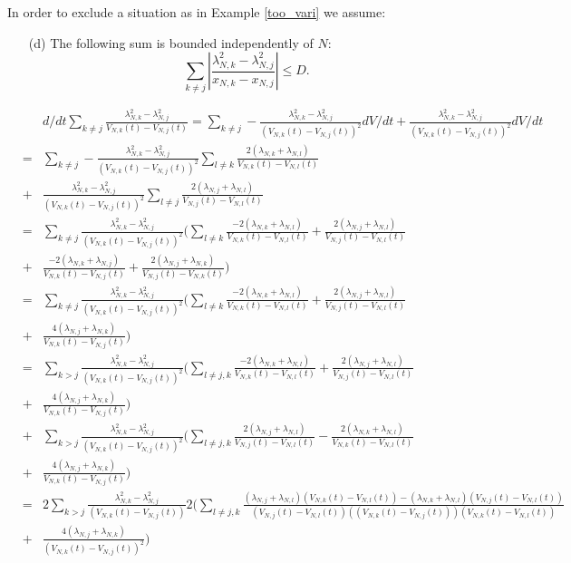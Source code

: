 \documentclass[a4paper,twoside,11pt]{article}
\theoremstyle{plain}
\theoremstyle{definition}
\theoremstyle{remark}
\begin{document}
In order to exclude a situation as in Example \ref{too_vari} we assume:
\begin{itemize}
\item[(d)] The following sum is bounded independently of $N$:
$$ \sum_{k\not=j} \left|\frac{\lambda_{N,k}^2-\lambda_{N,j}^2}{x_{N,k}-x_{N,j}}\right| \leq D. $$
\end{itemize}

{\color{orange} \begin{eqnarray*}
&& d/dt \sum_{k\not=j}\frac{\lambda_{N,k}^2-\lambda_{N,j}^2}{V_{N,k}(t)-V_{N,j}(t)} = \sum_{k\not=j}-\frac{\lambda_{N,k}^2-\lambda_{N,j}^2}{(V_{N,k}(t)-V_{N,j}(t))^2} dV/dt + \frac{\lambda_{N,k}^2-\lambda_{N,j}^2}{(V_{N,k}(t)-V_{N,j}(t))^2} dV/dt \\
&=&  \sum_{k\not=j}-\frac{\lambda_{N,k}^2-\lambda_{N,j}^2}{(V_{N,k}(t)-V_{N,j}(t))^2} \sum_{l\not=k}\frac{2(\lambda_{N,k}+\lambda_{N,l})}{V_{N,k}(t)-V_{N,l}(t)} \\
&+&  \frac{\lambda_{N,k}^2-\lambda_{N,j}^2}{(V_{N,k}(t)-V_{N,j}(t))^2} \sum_{l\not=j}\frac{2(\lambda_{N,j}+\lambda_{N,l})}{V_{N,j}(t)-V_{N,l}(t)} \\
&=& \sum_{k\not=j}\frac{\lambda_{N,k}^2-\lambda_{N,j}^2}{(V_{N,k}(t)-V_{N,j}(t))^2} (\sum_{l\not=k}\frac{-2(\lambda_{N,k}+\lambda_{N,l})}{V_{N,k}(t)-V_{N,l}(t)} +  \frac{2(\lambda_{N,j}+\lambda_{N,l})}{V_{N,j}(t)-V_{N,l}(t)}\\
&+& \frac{-2(\lambda_{N,k}+\lambda_{N,j})}{V_{N,k}(t)-V_{N,j}(t)}+ \frac{2(\lambda_{N,j}+\lambda_{N,k})}{V_{N,j}(t)-V_{N,k}(t)}) \\
&=& \sum_{k\not=j}\frac{\lambda_{N,k}^2-\lambda_{N,j}^2}{(V_{N,k}(t)-V_{N,j}(t))^2} (\sum_{l\not=k}\frac{-2(\lambda_{N,k}+\lambda_{N,l})}{V_{N,k}(t)-V_{N,l}(t)} +  \frac{2(\lambda_{N,j}+\lambda_{N,l})}{V_{N,j}(t)-V_{N,l}(t)}\\
&+&  \frac{4(\lambda_{N,j}+\lambda_{N,k})}{V_{N,k}(t)-V_{N,j}(t)}) \\
&=& \sum_{k>j}\frac{\lambda_{N,k}^2-\lambda_{N,j}^2}{(V_{N,k}(t)-V_{N,j}(t))^2} (\sum_{l\not=j,k}\frac{-2(\lambda_{N,k}+\lambda_{N,l})}{V_{N,k}(t)-V_{N,l}(t)} +  \frac{2(\lambda_{N,j}+\lambda_{N,l})}{V_{N,j}(t)-V_{N,l}(t)}\\
&+&  \frac{4(\lambda_{N,j}+\lambda_{N,k})}{V_{N,k}(t)-V_{N,j}(t)})  \\
&+& \sum_{k>j}\frac{\lambda_{N,k}^2-\lambda_{N,j}^2}{(V_{N,k}(t)-V_{N,j}(t))^2} (\sum_{l\not=j,k}\frac{2(\lambda_{N,j}+\lambda_{N,l})}{V_{N,j}(t)-V_{N,l}(t)} -  \frac{2(\lambda_{N,k}+\lambda_{N,l})}{V_{N,k}(t)-V_{N,l}(t)}\\
&+&  \frac{4(\lambda_{N,j}+\lambda_{N,k})}{V_{N,k}(t)-V_{N,j}(t)}) \\
&=& 2\sum_{k>j}\frac{\lambda_{N,k}^2-\lambda_{N,j}^2}{(V_{N,k}(t)-V_{N,j}(t))} 2(\sum_{l\not=j,k}\frac{(\lambda_{N,j}+\lambda_{N,l})(V_{N,k}(t)-V_{N,l}(t))-(\lambda_{N,k}+\lambda_{N,l})(V_{N,j}(t)-V_{N,l}(t))}{(V_{N,j}(t)-V_{N,l}(t))((V_{N,k}(t)-V_{N,j}(t)))(V_{N,k}(t)-V_{N,l}(t))}\\
&+&  \frac{4(\lambda_{N,j}+\lambda_{N,k})}{(V_{N,k}(t)-V_{N,j}(t))^2}) \\
\label{eq:}
\label{eq:}
\end{eqnarray*}}
\end{document}
